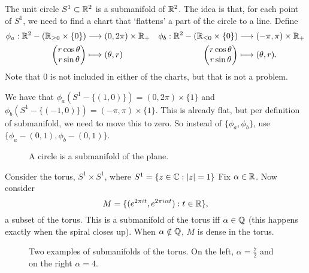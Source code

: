 \begin{eg}
The unit circle    $S^1 \subset \mathbb{R}^2$ is a submanifold of $\mathbb{R}^2$.
    The idea is that, for each point of $S^1$, we need to find a chart that `flattens' a part of the circle to a line. Define
    \begin{align*}
        \phi_a: \mathbb{R}^2 - (\mathbb{R}_{\ge 0} \times \{0\} ) &\longrightarrow (0, 2\pi) \times \mathbb{R}_+  & 
        \phi_b: \mathbb{R}^2 -  (\mathbb{R}_{\le  0} \times \{0\})  &\longrightarrow (-\pi, \pi) \times \mathbb{R}_+ \\
        \begin{pmatrix} r \cos \theta \\ r \sin \theta \end{pmatrix}   &\longmapsto (\theta, r) & 
        \begin{pmatrix} r \cos \theta \\ r \sin \theta \end{pmatrix}   &\longmapsto (\theta, r)
    .\end{align*}
Note that $0$ is not included in either of the charts, but that is not a problem.

We have that $\phi_a(S^{1} - \{(1, 0)\}) = (0, 2\pi) \times \{1\} $ and $\phi_b(S^{1} - \{ (-1, 0)\})  = (-\pi, \pi) \times \{1\} $.
This is already flat, but per definition of submanifold, we need to move this to zero.
So instead of $\{\phi_a, \phi_b\}$, use $\{\phi_a - (0, 1), \phi_b - (0, 1)\}$.


\begin{figure}[H]
    \centering
    \caption{A circle is a submanifold of the plane.}
    \label{fig:circle-submanifold-example}
\end{figure}

\end{eg}

\begin{eg}
 Consider the torus, $S^{1} \times S^{1}$,  where $S^{1} = \{z \in \mathbb{C} : |z| = 1\} $
 Fix $\alpha \in \mathbb{R}$. Now consider
 \[
     M = \{ (e^{ 2 \pi i t}, e^{2 \pi i \alpha t}): t \in \mathbb{R}\} 
 ,\] 
 a subset of the torus.
 This is a submanifold of the torus iff  $\alpha \in \mathbb{Q}$ (this happens exactly when 
 the spiral closes up). When $\alpha \notin \mathbb{Q}$, $M$ is dense in the torus.
\end{eg}


\begin{figure}[ht]
    \centering
    \caption{Two examples of submanifolds of the torus. On the left, $\alpha =  \frac{7}{2}$ and on the right  $\alpha = 4$.}
    \label{fig:submanifold-torus-example}
\end{figure}

